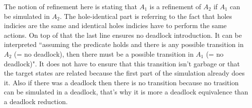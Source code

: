 \documentclass{article}
\begin{document}
The notion of refinement here is stating that \(A_1\) is a refinement of \(A_2\) if \(A_1\) can be simulated in \(A_2\).
The hole-identical part is referring to the fact that holes indicies are the same and identical holes indicies have to perform the same actions.
On top of that the last line ensures no deadlock introduction.
It can be interpreted ``assuming the predicate holds and there is any possible transition in \(A_2\) (= no deadlock), then there must be a possible transition in \(A_1\) (= no deadlock)".
It does not have to ensure that this transition isn't garbage or that the target states are related because the first part of the simulation already does it.
Also if there was a deadlock then there is no transition because no trasition can be simulated in a deadlock, that's why it is more a deadlock equivalence than a deadlock reduction.

\begin{exi} %
\end{exi}
\end{document}
